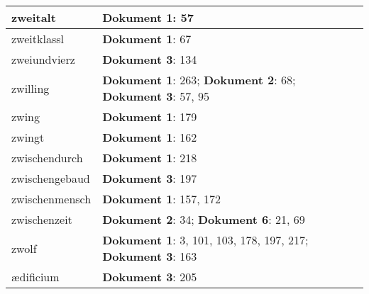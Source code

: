 \documentclass[a5paper]{article}
\begin{document}
\begin{longtable}[l]{|l|p{3in}|}
zweitalt & \textbf{Dokument 1}: 57 \\
\hline
zweitklassl & \textbf{Dokument 1}: 67 \\
\hline
zweiundvierz & \textbf{Dokument 3}: 134 \\
\hline
zwilling & \textbf{Dokument 1}: 263; \textbf{Dokument 2}: 68; \textbf{Dokument 3}: 57, 95 \\
\hline
zwing & \textbf{Dokument 1}: 179 \\
\hline
zwingt & \textbf{Dokument 1}: 162 \\
\hline
zwischendurch & \textbf{Dokument 1}: 218 \\
\hline
zwischengebaud & \textbf{Dokument 3}: 197 \\
\hline
zwischenmensch & \textbf{Dokument 1}: 157, 172 \\
\hline
zwischenzeit & \textbf{Dokument 2}: 34; \textbf{Dokument 6}: 21, 69 \\
\hline
zwolf & \textbf{Dokument 1}: 3, 101, 103, 178, 197, 217; \textbf{Dokument 3}: 163 \\
\hline
ædificium & \textbf{Dokument 3}: 205 \\
\hline
\end{longtable}
\end{document}

